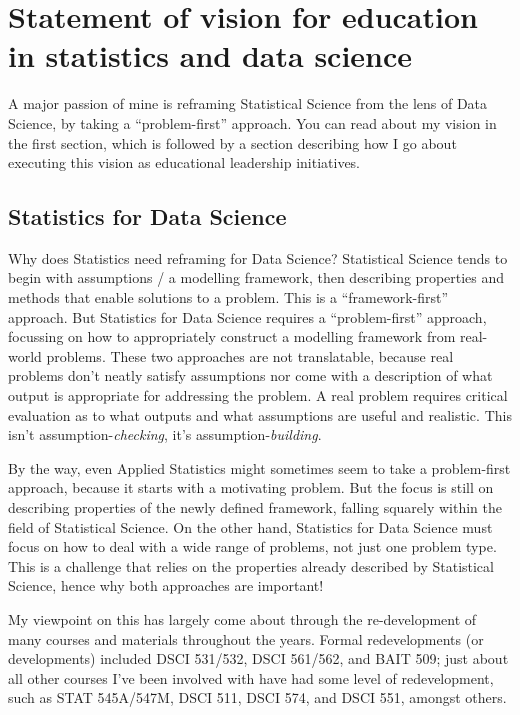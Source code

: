 \documentclass[]{article}
\begin{document}
\hypertarget{statement-of-vision-for-education-in-statistics-and-data-science}{%
\section{Statement of vision for education in statistics and data science}\label{statement-of-vision-for-education-in-statistics-and-data-science}}

A major passion of mine is reframing Statistical Science from the lens of Data Science, by taking a ``problem-first'' approach. You can read about my vision in the first section, which is followed by a section describing how I go about executing this vision as educational leadership initiatives.

\hypertarget{statistics-for-data-science}{%
\subsection{Statistics for Data Science}\label{statistics-for-data-science}}

Why does Statistics need reframing for Data Science? Statistical Science tends to begin with assumptions / a modelling framework, then describing properties and methods that enable solutions to a problem. This is a ``framework-first'' approach. But Statistics for Data Science requires a ``problem-first'' approach, focussing on how to appropriately construct a modelling framework from real-world problems. These two approaches are not translatable, because real problems don't neatly satisfy assumptions nor come with a description of what output is appropriate for addressing the problem. A real problem requires critical evaluation as to what outputs and what assumptions are useful and realistic. This isn't assumption-\emph{checking}, it's assumption-\emph{building}.

By the way, even Applied Statistics might sometimes seem to take a problem-first approach, because it starts with a motivating problem. But the focus is still on describing properties of the newly defined framework, falling squarely within the field of Statistical Science. On the other hand, Statistics for Data Science must focus on how to deal with a wide range of problems, not just one problem type. This is a challenge that relies on the properties already described by Statistical Science, hence why both approaches are important!

My viewpoint on this has largely come about through the re-development of many courses and materials throughout the years. Formal redevelopments (or developments) included DSCI 531/532, DSCI 561/562, and BAIT 509; just about all other courses I've been involved with have had some level of redevelopment, such as STAT 545A/547M, DSCI 511, DSCI 574, and DSCI 551, amongst others.
\end{document}
